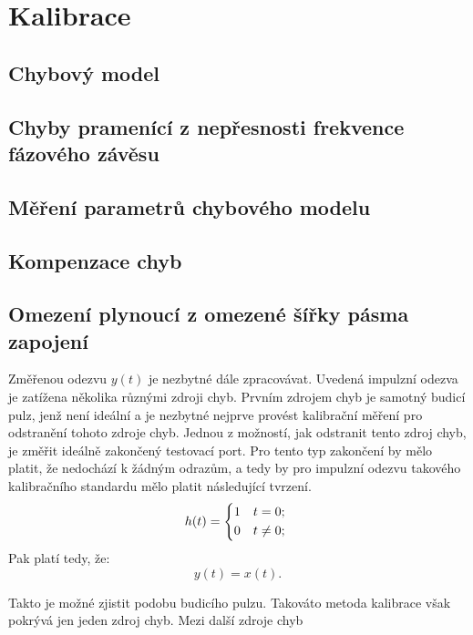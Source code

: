 \chapter{Kalibrace}

\section{Chybový model}

\section{Chyby pramenící z nepřesnosti frekvence fázového závěsu}

\section{Měření parametrů chybového modelu}

\section{Kompenzace chyb}

\section{Omezení plynoucí z omezené šířky pásma zapojení}


Změřenou odezvu $y(t)$ je nezbytné dále zpracovávat. Uvedená impulzní odezva je zatížena několika různými zdroji chyb. Prvním zdrojem chyb je samotný budicí pulz, jenž není ideální a je nezbytné nejprve provést kalibrační měření pro odstranění tohoto zdroje chyb. Jednou z možností, jak odstranit tento zdroj chyb, je změřit ideálně zakončený testovací port. Pro tento typ zakončení by mělo platit, že nedochází k žádným odrazům, a tedy by pro impulzní odezvu takového kalibračního standardu mělo platit následující tvrzení.
\begin{equation}
	h(t) =
	\begin{dcases*}
		1 & $t=0$;\\
		0 & $t\neq 0$;
	\end{dcases*}
\end{equation}
Pak platí tedy, že:
\begin{equation}
y(t)=x(t).
\end{equation}

Takto je možné zjistit podobu budicího pulzu. Takováto metoda kalibrace však pokrývá jen jeden zdroj chyb. Mezi další zdroje chyb


